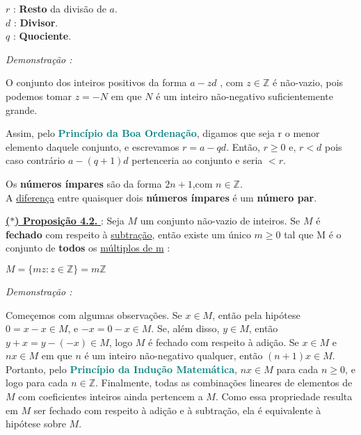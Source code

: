 \noindent $r$ : \textbf{Resto} da divisão de $a$. \\
$d$ : \textbf{Divisor}. \\
$q$ : \textbf{Quociente}.

\vspace{0.2cm}
\noindent\textit{Demonstração : }

O conjunto dos inteiros positivos da forma $a - zd \text{ , com } z \in \mathbb{Z}$ é não-vazio, pois podemos
tomar $z = -N$ em que $N$ é um inteiro não-negativo suficientemente grande.

Assim, pelo \textbf{\textcolor{teal}{Princípio da Boa Ordenação}}, digamos que seja r o menor elemento daquele conjunto, 
e escrevamos $r = a - qd$. Então, $r \ge 0$ e, $r < d$ pois caso contrário $a - (q + 1)d$ pertenceria ao conjunto e seria $< r$.

\begin{exemplo}[]
    Os \textbf{números ímpares} são da forma $2n + 1 \text{,com } n \in \mathbb{Z}$. \\
    A \underline{diferença} entre quaisquer dois \textbf{números ímpares} é um \textbf{número par}.
\end{exemplo}

\noindent\underline{\underline{\textbf{($\ast$) Proposição 4.2. }}} : Seja $M$ um conjunto não-vazio de inteiros. 
Se $M$ é \textbf{fechado} com respeito à \underline{subtração}, então existe um único $m \ge 0$ tal que M é o conjunto
de \textbf{todos} os \underline{múltiplos de m} :

\begin{center}
    $ M = \{mz : z \in \mathbb{Z} \} = m\mathbb{Z} $
\end{center}

\vspace{0.2cm}
\noindent\textit{Demonstração : }

Começemos com algumas observações. Se $x \in M$, então pela hipótese $0 = x - x \in M$, e
$-x = 0 - x \in M$. Se, além disso, $y \in M$, então $y + x = y - (-x) \in M$, logo $M$ é fechado com respeito à
adição. Se $x \in M$ e $nx \in M$ em que $n$ é um inteiro não-negativo qualquer, então $(n + 1)x \in M$. Portanto,
pelo \textbf{\textcolor{teal}{Princípio da Indução Matemática}}, $nx \in M$ para cada $n \ge 0$, e logo para
cada $n \in \mathbb{Z}$. Finalmente, todas as combinações lineares de elementos de $M$ com coeficientes inteiros ainda
pertencem a $M$. Como essa propriedade resulta em $M$ ser fechado com respeito à adição e à subtração,
ela é equivalente à hipótese sobre $M$.  


